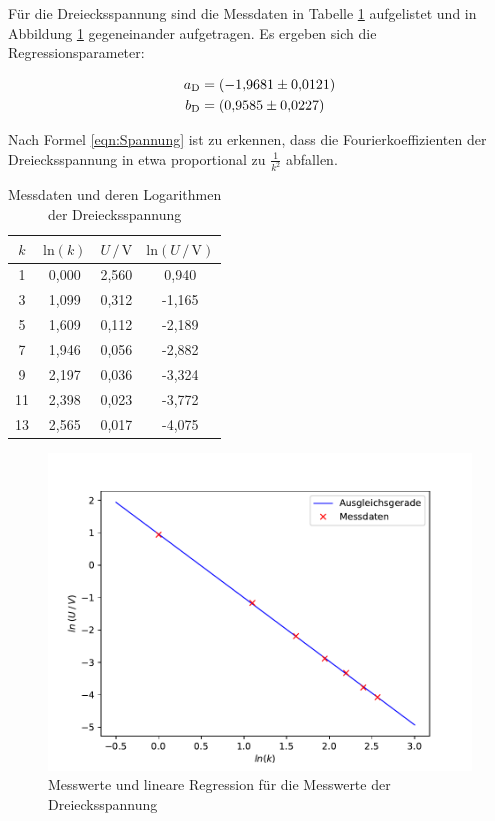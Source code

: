 Für die Dreiecksspannung sind die Messdaten in Tabelle \ref{tab:Messdaten3} aufgelistet und in Abbildung \ref{fig:Drei}
gegeneinander aufgetragen. Es ergeben sich die Regressionsparameter:

\begin{align*}
    a_\text{D} &= \SI{-1.9681 \pm 0.0121}{} \\
    b_\text{D} &= \SI{0.9585 \pm 0.0227}{}
\end{align*}

Nach Formel \eqref{eqn:Spannung} ist zu erkennen, dass die Fourierkoeffizienten der Dreiecksspannung in etwa
proportional zu $\frac{1}{k^2}$ abfallen.

\begin{table}
    \centering
    \caption{Messdaten und deren Logarithmen der Dreiecksspannung}
    \label{tab:Messdaten3}
    \begin{tabular}{c c c c}
    \toprule
    $k$ & $\text{ln} (k)$ & $U \,/\, \si{\volt}$ & $\text{ln}(U \,/\, \si{\volt})$ \\
    \midrule
     1 & 0,000 & 2,560 &  0,940 \\
     3 & 1,099 & 0,312 & -1,165 \\
     5 & 1,609 & 0,112 & -2,189 \\
     7 & 1,946 & 0,056 & -2,882 \\
     9 & 2,197 & 0,036 & -3,324 \\
    11 & 2,398 & 0,023 & -3,772 \\
    13 & 2,565 & 0,017 & -4,075 \\
    \bottomrule
    \end{tabular}
\end{table} 

\begin{figure}
    \centering
    \includegraphics[scale=1.0]{content/plot3.pdf}
    \caption{Messwerte und lineare Regression für die Messwerte der Dreiecksspannung}
    \label{fig:Drei}
\end{figure}

